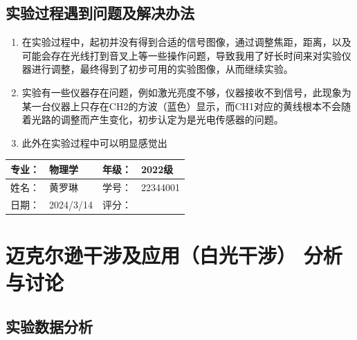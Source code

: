 \documentclass[dvipsnames, svgnames,a4paper,11pt]{article}
\begin{document}
		
	
	
	

	\subsection{实验过程遇到问题及解决办法}
	\begin{enumerate}
		\item 在实验过程中，起初并没有得到合适的信号图像，通过调整焦距，距离，以及可能会存在光线打到音叉上等一些操作问题，导致我用了好长时间来对实验仪器进行调整，最终得到了初步可用的实验图像，从而继续实验。
		\item 实验有一些仪器存在问题，例如激光亮度不够，仪器接收不到信号，此现象为某一台仪器上只存在CH2的方波（蓝色）显示，而CH1对应的黄线根本不会随着光路的调整而产生变化，初步认定为是光电传感器的问题。
		\item 此外在实验过程中可以明显感觉出
	\end{enumerate}

	
	
	\clearpage
	
	\begin{table}
		\renewcommand\arraystretch{1.7}
		\begin{tabularx}{\textwidth}{|X|X|X|X|}
			\hline
			专业：& 物理学 &年级：& 2022级\\
			\hline
			姓名： & 黄罗琳 & 学号：& 22344001\\
			\hline
			日期：& 2024/3/14 & 评分： &\\
			\hline
		\end{tabularx}
	\end{table}
	
	\section{迈克尔逊干涉及应用（白光干涉） \quad\heiti  分析与讨论}
	
	\subsection{实验数据分析}
	
\end{document}

